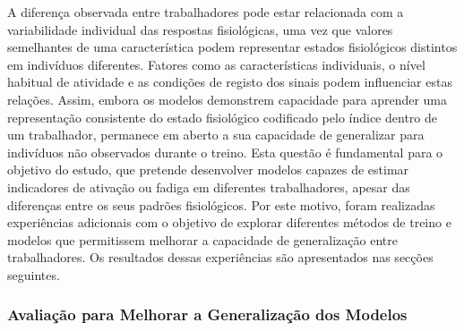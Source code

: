 \begin{table}[H]
\centering
\caption{Desempenho da Regressão Linear treinada com W01 e aplicada a diferentes trabalhadores}
\label{tab:generalizacao_trabalhadores}
%
\end{table}

A diferença observada entre trabalhadores pode estar relacionada com a variabilidade individual das respostas fisiológicas, uma vez que valores semelhantes de uma característica podem representar estados fisiológicos distintos em indivíduos diferentes. Fatores como as características individuais, o nível habitual de atividade e as condições de registo dos sinais podem influenciar estas relações. Assim, embora os modelos demonstrem capacidade para aprender uma representação consistente do estado fisiológico codificado pelo índice dentro de um trabalhador, permanece em aberto a sua capacidade de generalizar para indivíduos não observados durante o treino. Esta questão é fundamental para o objetivo do estudo, que pretende desenvolver modelos capazes de estimar indicadores de ativação ou fadiga em diferentes trabalhadores, apesar das diferenças entre os seus padrões fisiológicos. Por este motivo, foram realizadas experiências adicionais com o objetivo de explorar diferentes métodos de treino e modelos que permitissem melhorar a capacidade de generalização entre trabalhadores. Os resultados dessas experiências são apresentados nas secções seguintes.

\subsubsection*{Avaliação para Melhorar a Generalização dos Modelos}

